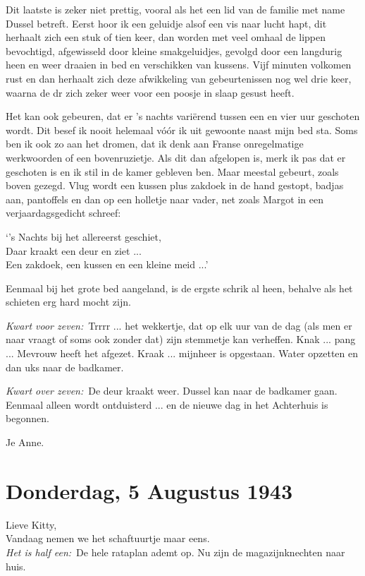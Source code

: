 \documentclass{book}
\begin{document}
Dit laatste is zeker niet prettig, vooral als het een lid van de familie
met name Dussel betreft. Eerst hoor ik een geluidje alsof een vis naar
lucht hapt, dit herhaalt zich een stuk of tien keer, dan worden met veel
omhaal de lippen bevochtigd, afgewisseld door kleine smakgeluidjes,
gevolgd door een langdurig heen en weer draaien in bed en verschikken
van kussens. Vijf minuten volkomen rust en dan herhaalt zich deze
afwikkeling van gebeurtenissen nog wel drie keer, waarna de dr zich
zeker weer voor een poosje in slaap gesust heeft.

Het kan ook gebeuren, dat er 's nachts variërend tussen een en vier uur
geschoten wordt. Dit besef ik nooit helemaal vóór ik uit gewoonte naast
mijn bed sta. Soms ben ik ook zo aan het dromen, dat ik denk aan Franse
onregelmatige werkwoorden of een bovenruzietje. Als dit dan afgelopen
is, merk ik pas dat er geschoten is en ik stil in de kamer gebleven ben.
Maar meestal gebeurt, zoals boven gezegd. Vlug wordt een kussen plus
zakdoek in de hand gestopt, badjas aan, pantoffels en dan op een
holletje naar vader, net zoals Margot in een verjaardagsgedicht schreef:

`'s Nachts bij het allereerst geschiet,\\Daar kraakt een deur en ziet
...\\Een zakdoek, een kussen en een kleine meid ...'

Eenmaal bij het grote bed aangeland, is de ergste schrik al heen,
behalve als het schieten erg hard mocht zijn.

\emph{Kwart voor zeven:}~Trrrr ... het wekkertje, dat op elk uur van de
dag (als men er naar vraagt of soms ook zonder dat) zijn stemmetje kan
verheffen. Knak ... pang ... Mevrouw heeft het afgezet. Kraak ...
mijnheer is opgestaan. Water opzetten en dan uks naar de badkamer.

\emph{Kwart over zeven:}~De deur kraakt weer. Dussel kan naar de
badkamer gaan. Eenmaal alleen wordt ontduisterd ... en de nieuwe dag in
het Achterhuis is begonnen.

Je Anne.

\chapter{Donderdag, 5 Augustus 1943}

Lieve Kitty,\\Vandaag nemen we het schaftuurtje maar eens.\\\emph{Het is
half een:}~De hele rataplan ademt op. Nu zijn de magazijnknechten naar
huis.
\end{document}
